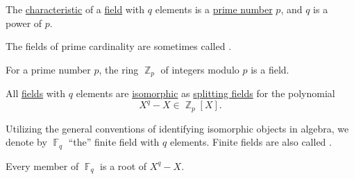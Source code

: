 \begin{theorem}\label{thm:finite_fields}
  \hfill
  \begin{thmenum}
     The \hyperref[def:ring_characteristic]{characteristic} of a \hyperref[def:field]{field} with \( q \) elements is a \hyperref[def:prime_number]{prime number} \( p \), and \( q \) is a power of \( p \).

    The fields of prime cardinality are sometimes called .

     For a prime number \( p \), the ring \hyperref[thm:ring_of_integers_modulo]{\( \BbbZ_p \)} of integers modulo \( p \) is a field.

     All \hyperref[def:field]{fields} with \( q \) elements are \hyperref[def:field/homomorphism]{isomorphic} as \hyperref[def:splitting_field]{splitting fields} for the polynomial
    \begin{equation*}
      X^q - X \in \BbbZ_p[X].
    \end{equation*}

    Utilizing the general conventions of identifying isomorphic objects in algebra, we denote by \( \BbbF_q \) \enquote{the} finite field with \( q \) elements. Finite fields are also called .

    Every member of \( \BbbF_q \) is a root of \( X^q - X \).
  \end{thmenum}
\end{theorem}

